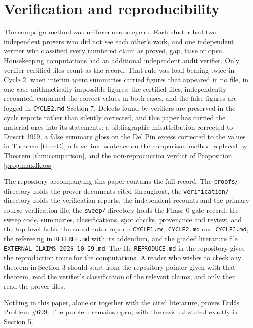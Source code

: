 \documentclass[11pt]{article}
\theoremstyle{remark}
\begin{document}
\section{Verification and reproducibility}

The campaign method was uniform across cycles. Each cluster had two independent provers who did not see each other's work, and one independent verifier who classified every numbered claim as proved, gap, false or open. Housekeeping computations had an additional independent audit verifier. Only verifier certified files count as the record. That rule was load bearing twice in Cycle 2, when interim agent summaries carried figures that appeared in no file, in one case arithmetically impossible figures; the certified files, independently recounted, contained the correct values in both cases, and the false figures are logged in \texttt{CYCLE2.md} Section 7. Defects found by verifiers are preserved in the cycle reports rather than silently corrected, and this paper has carried the material ones into its statements: a bibliographic misattribution corrected to Dusart 1999, a false summary gloss on the Del Pin excess corrected to the values in Theorem \ref{thm:G}, a false final sentence on the comparison method replaced by Theorem \ref{thm:comparison}, and the non-reproduction verdict of Proposition \ref{prop:maxdkaos}.

The repository accompanying this paper contains the full record. The \texttt{proofs/} directory holds the prover documents cited throughout, the \texttt{verification/} directory holds the verification reports, the independent recounts and the primary source verification file, the \texttt{sweep/} directory holds the Phase 0 gate record, the sweep code, summaries, classifications, spot checks, provenance and review, and the top level holds the coordinator reports \texttt{CYCLE1.md}, \texttt{CYCLE2.md} and \texttt{CYCLE3.md}, the refereeing in \texttt{REFEREE.md} with its addendum, and the graded literature file \texttt{EXTERNAL\_CLAIMS\_2026-10-29.md}. The file \texttt{REPRODUCE.md} in the repository gives the reproduction route for the computations. A reader who wishes to check any theorem in Section 3 should start from the repository pointer given with that theorem, read the verifier's classification of the relevant claims, and only then read the prover files.

Nothing in this paper, alone or together with the cited literature, proves Erd\H{o}s Problem \#699. The problem remains open, with the residual stated exactly in Section 5.
\end{document}
